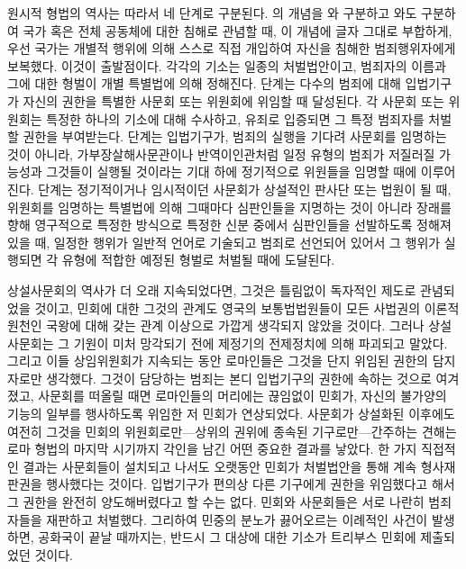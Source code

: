 원시적 형법의 역사는 따라서 네 단계로 구분된다.
의 개념을
와 구분하고
와도 구분하여
국가 혹은 전체 공동체에 대한 침해로 관념할 때,
이 개념에 글자 그대로 부합하게,
우선
국가는
개별적 행위에 의해 스스로 직접 개입하여
자신을 침해한 범죄행위자에게 보복했다.
이것이 출발점이다.
각각의 기소는 일종의 처벌법안이고,
범죄자의 이름과 그에 대한 형벌이 개별 특별법에 의해 정해진다.
 단계는
다수의 범죄에 대해
입법기구가 자신의 권한을 특별한 사문회 또는 위원회에 위임할 때
달성된다.
각 사문회 또는 위원회는
특정한 하나의 기소에 대해 수사하고,
유죄로 입증되면 그 특정 범죄자를 처벌할 권한을 부여받는다.
 단계는
입법기구가,
범죄의 실행을 기다려
사문회를 임명하는 것이 아니라,
가부장살해사문관이나 반역이인관처럼
일정 유형의 범죄가 저질러질 가능성과
 그것들이 실행될 것이라는 기대 하에
정기적으로 위원들을 임명할 때에 이루어진다.
 단계는
정기적이거나 임시적이던 사문회가
상설적인 판사단 또는 법원이 될 때,
위원회를 임명하는 특별법에 의해 그때마다
심판인들을
지명하는 것이 아니라
장래를 향해 영구적으로
특정한 방식으로 특정한 신분 중에서
심판인들을
선발하도록 정해져있을 때,
일정한 행위가 일반적 언어로 기술되고 범죄로 선언되어 있어서
그 행위가 실행되면 각 유형에 적합한 예정된 형벌로 처벌될 때에
도달된다.

상설사문회의 역사가 더 오래 지속되었다면,
그것은 틀림없이 독자적인 제도로 관념되었을 것이고,
민회에 대한 그것의 관계도
영국의 보통법법원들이
모든 사법권의 이론적 원천인
국왕에 대해 갖는 관계 이상으로
가깝게 생각되지 않았을 것이다.
그러나
상설사문회는 그 기원이 미처 망각되기 전에
제정기의 전제정치에 의해
파괴되고 말았다.
그리고 이들 상임위원회가 지속되는 동안
로마인들은
그것을 단지 위임된 권한의 담지자로만 생각했다.
그것이 담당하는 범죄는 본디 입법기구의 권한에 속하는 것으로 여겨졌고,
사문회를 떠올릴 때면
로마인들의 머리에는
끊임없이 민회가,
자신의 불가양의 기능의 일부를 행사하도록 위임한 저 민회가
연상되었다.
사문회가
상설화된 이후에도 여전히
그것을 민회의 위원회로만---상위의 권위에 종속된 기구로만---간주하는 견해는
로마 형법의 마지막 시기까지 각인을 남긴 어떤 중요한 결과를 낳았다.
한 가지 직접적인 결과는
사문회들이 설치되고 나서도 오랫동안
민회가
처벌법안을 통해
계속
형사재판권을 행사했다는 것이다.
입법기구가 편의상 다른 기구에게 권한을 위임했다고 해서
그 권한을 완전히 양도해버렸다고 할 수는 없다.
민회와 사문회들은 서로 나란히 범죄자들을 재판하고 처벌했다.
그리하여
민중의 분노가 끓어오르는 이례적인 사건이 발생하면,
공화국이 끝날 때까지는,
반드시 그 대상에 대한 기소가
트리부스 민회에 제출되었던 것이다.

